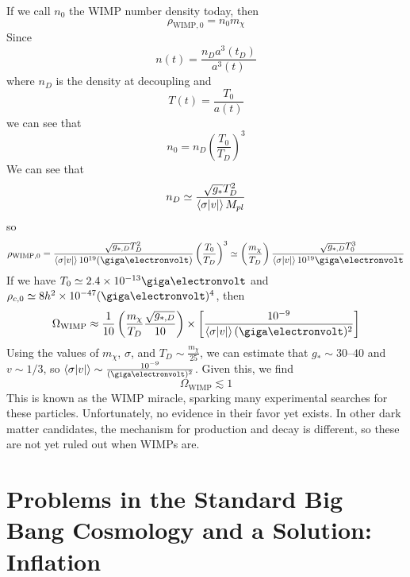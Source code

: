 \documentclass[a4paper,twoside,master.tex]{subfiles}
\begin{document}
If we call $ n_0 $ the WIMP number density today, then
\begin{equation}
    \rho_{\text{WIMP}, 0} = n_0 m_{\chi}
\end{equation}
Since
\begin{equation}
    n(t) = \frac{n_D a^3(t_D)}{a^3(t)}
\end{equation}
where $ n_D $ is the density at decoupling and
\begin{equation}
    T(t) = \frac{T_0}{a(t)}
\end{equation}
we can see that
\begin{equation}
    n_0 = n_D \left( \frac{T_0}{T_D} \right)^3
\end{equation}
We can see that
\begin{equation}
    n_D \simeq \frac{\sqrt{g_*} T_D^2}{\ev{\sigma \abs{v}} M_{pl}}
\end{equation}
so
\begin{equation}
    \rho_{\text{WIMP}, 0} = \frac{\sqrt{g_{*,D}} T_D^2}{\ev{\sigma \abs{v}} 10^{19} (\giga\electronvolt)} \left( \frac{T_0}{T_D} \right)^3 \simeq \left( \frac{m_{\chi}}{T_D} \right) \frac{\sqrt{g_{*,D}} T_0^3}{\ev{\sigma \abs{v}} 10^{19} \giga\electronvolt}
\end{equation}
If we have $ T_0 \simeq 2.4 \times 10^{-13} \giga\electronvolt $ and $ \rho_{c,0} \simeq 8 h^2 \times 10^{-47} (\giga\electronvolt)^4 $, then
\begin{equation}
    \Omega_{\text{WIMP}} \approx \frac{1}{10} \left( \frac{m_{\chi}}{T_D} \frac{\sqrt{g_{*,D}}}{10} \right) \times \left[ \frac{10^{-9}}{\ev{\sigma \abs{v}} (\giga\electronvolt)^2} \right]
\end{equation}
Using the values of $ m_{\chi} $, $ \sigma $, and $ T_D \sim \frac{m_{\chi}}{25} $, we can estimate that $ g_* \sim 30\text{--}40 $ and $ v \sim 1/3 $, so $ \ev{\sigma \abs{v}} \sim \frac{10^{-9}}{(\giga\electronvolt)^2} $. Given this, we find
\begin{equation}
    \Omega_{\text{WIMP}} \lesssim 1
\end{equation}
This is known as the WIMP miracle, sparking many experimental searches for these particles. Unfortunately, no evidence in their favor yet exists. In other dark matter candidates, the mechanism for production and decay is different, so these are not yet ruled out when WIMPs are.


\section{Problems in the Standard Big Bang Cosmology and a Solution: Inflation}\label{sec:problems_in_the_standard_big_bang_cosmology_and_a_solution:_inflation}
\end{document}
